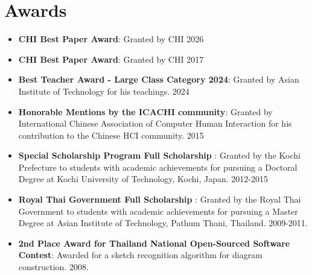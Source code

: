 \documentclass[letterpaper,11pt]{article}
\newcommand{\resumeItem}[2]{
  \item\small{
    \textbf{#1}{: #2 \vspace{-2pt}}
  }
}
\newcommand{\resumeSubItem}[2]{\resumeItem{#1}{#2}\vspace{-4pt}}
\newcommand{\resumeSubHeadingListStart}{\begin{itemize}[leftmargin=*]}
\newcommand{\resumeSubHeadingListEnd}{\end{itemize}}
\begin{document}
\section{Awards}
\resumeSubHeadingListStart
\resumeSubItem{CHI Best Paper Award}
{Granted by CHI 2026}
\resumeSubItem{CHI Best Paper Award}
{Granted by CHI 2017}
\resumeSubItem{Best Teacher Award - Large Class Category 2024}
{Granted by Asian Institute of Technology for his teachings. 2024}
\resumeSubItem{Honorable Mentions by the ICACHI community}
{Granted by International Chinese Association of Computer Human Interaction for his contribution to the Chinese HCI community. 2015}
\resumeSubItem{Special Scholarship Program Full Scholarship }
{Granted by the Kochi Prefecture to students with academic achievements for pursuing a Doctoral Degree at Kochi University of Technology, Kochi, Japan.  2012-2015}
\resumeSubItem{Royal Thai Government Full Scholarship }
{Granted by the Royal Thai Government to students with academic achievements for pursuing a Master Degree at Asian Institute of Technology, Pathum Thani, Thailand. 2009-2011.}
\resumeSubItem{2nd Place Award for Thailand National Open-Sourced Software Contest}
{Awarded for a sketch recognition algorithm for diagram construction. 2008.}
\resumeSubHeadingListEnd


\end{document}
